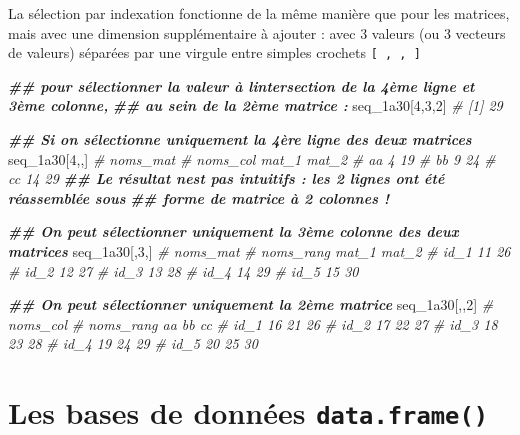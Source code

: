 \documentclass[
]{book}
\newenvironment{Shaded}{\begin{snugshade}}{\end{snugshade}}
\newcommand{\CommentTok}[1]{\textcolor[rgb]{0.56,0.35,0.01}{\textit{#1}}}
\newcommand{\DecValTok}[1]{\textcolor[rgb]{0.00,0.00,0.81}{#1}}
\newcommand{\DocumentationTok}[1]{\textcolor[rgb]{0.56,0.35,0.01}{\textbf{\textit{#1}}}}
\newcommand{\NormalTok}[1]{#1}
\begin{document}
La sélection par indexation fonctionne de la même manière que pour les matrices, mais avec une dimension supplémentaire à ajouter : avec 3 valeurs (ou 3 vecteurs de valeurs) séparées par une virgule entre simples crochets \texttt{{[}\ ,\ ,\ {]}}

\begin{Shaded}
\begin{Highlighting}[]
\DocumentationTok{\#\# pour sélectionner la valeur à l\textquotesingle{}intersection de la 4ème ligne et 3ème colonne,}
\DocumentationTok{\#\# au sein de la 2ème matrice : }
\NormalTok{seq\_1a30[}\DecValTok{4}\NormalTok{,}\DecValTok{3}\NormalTok{,}\DecValTok{2}\NormalTok{] }\CommentTok{\# [1] 29}

\DocumentationTok{\#\# Si on sélectionne uniquement la 4ère ligne des deux matrices}
\NormalTok{seq\_1a30[}\DecValTok{4}\NormalTok{,,]}
\CommentTok{\#         noms\_mat}
\CommentTok{\# noms\_col mat\_1 mat\_2}
\CommentTok{\#       aa     4    19}
\CommentTok{\#       bb     9    24}
\CommentTok{\#       cc    14    29}
\DocumentationTok{\#\# Le résultat n\textquotesingle{}est pas intuitifs : les 2 lignes ont été réassemblée sous }
\DocumentationTok{\#\# forme de matrice à 2 colonnes !}

\DocumentationTok{\#\# On peut sélectionner uniquement la 3ème colonne des deux matrices}
\NormalTok{seq\_1a30[,}\DecValTok{3}\NormalTok{,]}
\CommentTok{\#          noms\_mat}
\CommentTok{\# noms\_rang mat\_1 mat\_2}
\CommentTok{\#      id\_1    11    26}
\CommentTok{\#      id\_2    12    27}
\CommentTok{\#      id\_3    13    28}
\CommentTok{\#      id\_4    14    29}
\CommentTok{\#      id\_5    15    30}

\DocumentationTok{\#\# On peut sélectionner uniquement la 2ème matrice}
\NormalTok{seq\_1a30[,,}\DecValTok{2}\NormalTok{]}
\CommentTok{\#          noms\_col}
\CommentTok{\# noms\_rang aa bb cc}
\CommentTok{\#      id\_1 16 21 26}
\CommentTok{\#      id\_2 17 22 27}
\CommentTok{\#      id\_3 18 23 28}
\CommentTok{\#      id\_4 19 24 29}
\CommentTok{\#      id\_5 20 25 30}
\end{Highlighting}
\end{Shaded}

\section{\texorpdfstring{Les bases de données \texttt{data.frame()}}{Les bases de données data.frame()}}\label{les-bases-de-donnuxe9es-data.frame}
\end{document}
